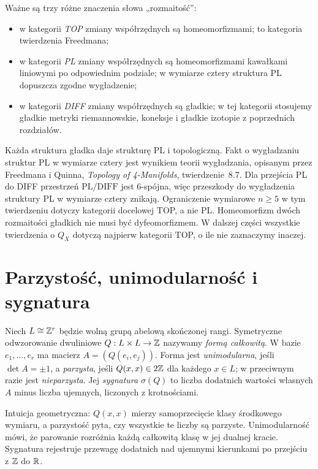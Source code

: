 Ważne są trzy różne znaczenia słowa „rozmaitość”:
\begin{itemize}[leftmargin=2em]
\item w kategorii \emph{TOP} zmiany współrzędnych są
homeomorfizmami; to kategoria twierdzenia Freedmana;
\item w kategorii \emph{PL} zmiany współrzędnych są homeomorfizmami
kawałkami liniowymi po odpowiednim podziale; w wymiarze cztery
struktura PL dopuszcza zgodne wygładzenie;
\item w kategorii \emph{DIFF} zmiany współrzędnych są
gładkie; w tej kategorii stosujemy gładkie metryki riemannowskie, koneksje i
gładkie izotopie z poprzednich rozdziałów.
\end{itemize}
Każda struktura gładka daje strukturę PL i topologiczną.
Fakt o wygładzaniu struktur PL w wymiarze cztery jest
wynikiem teorii wygładzania, opisanym przez
Freedmana i Quinna, \emph{Topology of 4-Manifolds},
twierdzenie~8.7. Dla przejścia PL do DIFF przestrzeń
$\mathrm{PL}/\mathrm{DIFF}$ jest $6$-spójna, więc
przeszkody do wygładzenia struktury PL w wymiarze cztery
znikają. Ograniczenie wymiarowe $n\geq5$ w tym twierdzeniu
dotyczy kategorii docelowej TOP, a nie PL.
Homeomorfizm dwóch rozmaitości gładkich nie musi być
dyfeomorfizmem. W dalszej części wszystkie twierdzenia
o $Q_X$ dotyczą najpierw kategorii TOP, o ile nie
zaznaczymy inaczej.

\section{Parzystość, unimodularność i sygnatura}
\label{sec:freedman-lattices}

\begin{definicja}
\label{def:freedman-integral-form}
Niech $L\cong\mathbb{Z}^r$ będzie wolną grupą abelową skończonej
rangi. Symetryczne odwzorowanie dwuliniowe
$Q:L\times L\to\mathbb{Z}$ nazywamy \emph{formą całkowitą}.
W bazie $e_1,\ldots,e_r$ ma macierz
$A=(Q(e_i,e_j))$. Forma jest \emph{unimodularna},
jeśli $\det A=\pm1$, a \emph{parzysta}, jeśli
$Q(x,x)\in2\mathbb{Z}$ dla każdego $x\in L$;
w przeciwnym razie jest \emph{nieparzysta}.
Jej \emph{sygnatura} $\sigma(Q)$ to liczba dodatnich
wartości własnych $A$ minus liczba ujemnych, liczonych
z krotnościami.
\end{definicja}

Intuicja geometryczna: $Q(x,x)$ mierzy samoprzecięcie
klasy środkowego wymiaru, a parzystość pyta, czy
wszystkie te liczby są parzyste. Unimodularność mówi,
że parowanie rozróżnia każdą całkowitą klasę w jej
dualnej kracie. Sygnatura rejestruje przewagę dodatnich
nad ujemnymi kierunkami po przejściu z $\mathbb{Z}$ do $\mathbb{R}$.

